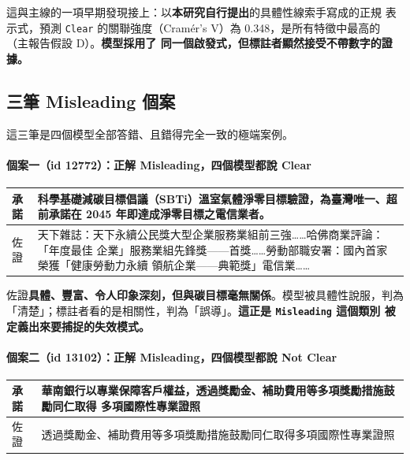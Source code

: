 \documentclass[11pt,a4paper]{ctexart}
\newcommand{\fn}[1]{\texttt{#1}}
\begin{document}
這與主線的一項早期發現接上：以\textbf{本研究自行提出}的具體性線索手寫成的正規
表示式，預測 \fn{Clear} 的關聯強度（Cramér's V）為 0.348，是所有特徵中最高的
（主報告假設 D）。\textbf{模型採用了
同一個啟發式，但標註者顯然接受不帶數字的證據。}

\subsection{三筆 Misleading 個案}

這三筆是四個模型全部答錯、且錯得完全一致的極端案例。

\paragraph{個案一（id 12772）：正解 Misleading，四個模型都說 Clear}

\begin{table}[h]
\centering\small
\begin{tabular}{@{}p{2cm}p{12cm}@{}}
\toprule
承諾 & 科學基礎減碳目標倡議（SBTi）溫室氣體淨零目標驗證，為臺灣唯一、超前承諾在
       2045 年即達成淨零目標之電信業者。 \\
\midrule
佐證 & 天下雜誌：天下永續公民獎大型企業服務業組前三強……哈佛商業評論：「年度最佳
       企業」服務業組先鋒獎——首獎……勞動部職安署：國內首家榮獲「健康勞動力永續
       領航企業——典範獎」電信業…… \\
\bottomrule
\end{tabular}
\end{table}

佐證\textbf{具體、豐富、令人印象深刻，但與碳目標毫無關係}。模型被具體性說服，判為
「清楚」；標註者看的是相關性，判為「誤導」。\textbf{這正是 \fn{Misleading} 這個類別
被定義出來要捕捉的失效模式。}

\paragraph{個案二（id 13102）：正解 Misleading，四個模型都說 Not Clear}

\begin{table}[h]
\centering\small
\begin{tabular}{@{}p{2cm}p{12cm}@{}}
\toprule
承諾 & 華南銀行以專業保障客戶權益，透過獎勵金、補助費用等多項獎勵措施鼓勵同仁取得
       多項國際性專業證照 \\
\midrule
佐證 & 透過獎勵金、補助費用等多項獎勵措施鼓勵同仁取得多項國際性專業證照 \\
\bottomrule
\end{tabular}
\end{table}
\end{document}
